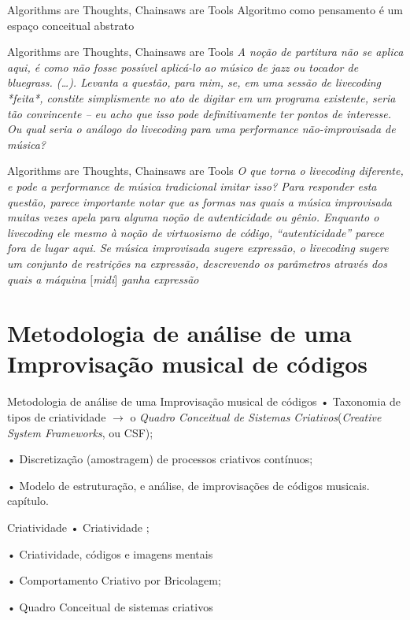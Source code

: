 \documentclass[aspectratio=169]{beamer}
\begin{document}
\begin{frame}{Algorithms are Thoughts, Chainsaws are Tools}
Algoritmo como pensamento é um espaço conceitual abstrato
\end{frame}

\begin{frame}{Algorithms are Thoughts, Chainsaws are Tools}
\emph{A noção de partitura não se aplica aqui, é como não fosse possível aplicá-lo ao músico de \emph{jazz} ou tocador de \emph{bluegrass}. (\ldots). Levanta a questão, para mim, se, em uma sessão de \emph{livecoding} *feita*, constite simplismente no ato de digitar em um programa existente, seria tão convincente -- eu acho que isso pode definitivamente ter pontos de interesse. Ou qual seria o análogo do \emph{livecoding} para uma performance não-improvisada de música?}
\end{frame}

\begin{frame}{Algorithms are Thoughts, Chainsaws are Tools}
\emph{O que torna o \emph{livecoding} diferente, e pode a performance de música tradicional imitar isso? Para responder esta questão, parece importante notar que as formas nas quais a música improvisada muitas vezes apela para alguma noção de autenticidade ou gênio. Enquanto o \emph{livecoding} ele mesmo à noção de virtuosismo de código, ``autenticidade'' parece fora de lugar aqui. Se música improvisada sugere expressão, o \emph{livecoding} sugere um conjunto de restrições na expressão, descrevendo os parâmetros através dos quais a máquina $[$midi$]$ ganha expressão}
\end{frame}

\section{Metodologia de análise de uma Improvisação musical de códigos}
\begin{frame}{Metodologia de análise de uma Improvisação musical de códigos}
• Taxonomia de tipos de criatividade $\rightarrow$ o \emph{Quadro Conceitual de Sistemas Criativos}(\emph{Creative System Frameworks}, ou CSF);

• Discretização (amostragem) de processos criativos contínuos;

• Modelo de estruturação, e análise, de improvisações de códigos musicais.
 capítulo.
 \end{frame}
 
 
\begin{frame}{Criatividade}
• Criatividade \cite{boden_creative_1990};

• Criatividade, códigos e imagens mentais \cite{McLean2011}

• Comportamento Criativo por Bricolagem;

• Quadro Conceitual de sistemas criativos
\end{frame}
\end{document}
